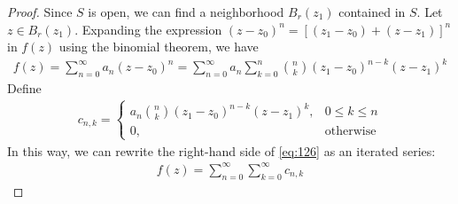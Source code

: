 \documentclass[thmcnt=section, 12pt]{my-elegantbook}
\begin{document}
\begin{proof}
    Since $S$ is open, we can find a neighborhood $B_r(z_1)$ contained in $S$. Let $z \in B_r(z_1)$. Expanding the expression $(z-z_0)^n = [(z_1 - z_0) + (z  - z_1)]^n$ in $f(z)$ using the binomial theorem, we have 
    \begin{align}
        f(z) = \sum_{n=0}^\infty a_n (z - z_0)^n
        = \sum_{n=0}^\infty a_n \sum_{k=0}^n \binom{n}{k} (z_1 - z_0)^{n-k} (z - z_1)^k
        \label{eq:126}
    \end{align}
    Define
    \begin{align*}
        c_{n,k} = \begin{cases}
            a_n \binom{n}{k} (z_1 - z_0)^{n-k} (z - z_1)^k,
            &0 \leq k \leq n \\ 
            0,
            & \text{otherwise}
        \end{cases}
    \end{align*}
    In this way, we can rewrite the right-hand side of \eqref{eq:126} as an iterated series:
    \begin{align}
        f(z) = \sum_{n=0}^\infty \sum_{k=0}^\infty c_{n,k}
        \label{eq:127}
    \end{align}
    

\end{proof}
\end{document}
